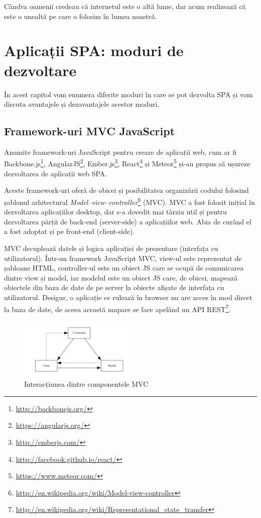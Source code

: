 \begin{savequote}[75mm]
Cândva oamenii credeau că internetul este o altă lume, dar acum realizează
că este o unealtă pe care o folosim în lumea noastră.
\end{savequote}

\chapter{Aplicații SPA: moduri de dezvoltare}
În acest capitol vom enumera diferite moduri în care se pot dezvolta SPA și
vom discuta avantajele și dezavantajele acestor moduri.

\section{Framework-uri MVC JavaScript}
Anumite framework-uri JavaScript pentru creare de aplicații web, cum ar fi
Backbone.js\footnote{\url{http://backbonejs.org/}},
AngularJS\footnote{\url{https://angularjs.org/}},
Ember.js\footnote{\url{http://emberjs.com/}},
React\footnote{\url{http://facebook.github.io/react/}} și
Meteor\footnote{\url{https://www.meteor.com/}}
și-au propus să ușureze dezvoltarea de aplicații web SPA.

Aceste framework-uri oferă de obicei și posibilitatea organizării codului
folosind șablonul arhitectural 
\emph{Model–view–controller}\footnote{\url{http://en.wikipedia.org/wiki/Model-view-controller}}
(MVC). MVC a fost
folosit inițial în dezvoltarea aplicațiilor desktop, dar s-a dovedit mai târziu
util și pentru dezvoltarea părții de back-end (server-side) a aplicațiilor web.
Abia de curând el a fost adoptat și pe front-end (client-side).

MVC decuplează datele și logica aplicației de prezentare (interfața cu utilizatorul). Într-un framework JavaScript MVC,
view-ul este reprezentat de șabloane HTML, controller-ul este un obiect JS
care se ocupă de comunicarea dintre view și model, iar modelul este un obiect JS
care, de obicei, mapează obiectele din baza de date de pe server la obiecte
afișate de interfața cu utilizatorul. Desigur, o aplicație ce rulează în browser
nu are acces în mod direct la baza de date, de aceea această mapare se face apelând un
API REST\footnote{\url{http://en.wikipedia.org/wiki/Representational\_state\_transfer}}.

\begin{figure}[t]
  \centering
    \includegraphics[width=0.5\textwidth]{./MVC}
  \caption{Interacțiunea dintre componentele MVC}
\end{figure}

